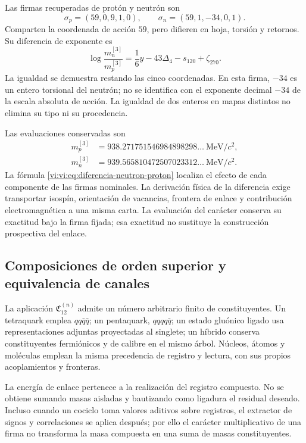 Las firmas recuperadas de protón y neutrón son
\[
 \sigma_p=(59,0,9,1,0),\qquad
 \sigma_n=(59,1,-34,0,1).
\]
Comparten la coordenada de acción \(59\), pero difieren en hoja,
torsión y retornos. Su diferencia de exponente es
\begin{equation}
 \log\frac{m_n^{[3]}}{m_p^{[3]}}
 =\frac16y-43\Delta_4-s_{120}+\zeta_{270}.
 \label{vi:vi:eq:diferencia-neutron-proton}
\end{equation}
La igualdad se demuestra restando las cinco coordenadas. En esta firma,
\(-34\) es un entero torsional del neutrón; no se identifica con el
exponente decimal \(-34\) de la escala absoluta de acción. La igualdad
de dos enteros en mapas distintos no elimina su tipo ni su procedencia.

Las evaluaciones conservadas son
\begin{align*}
 m_p^{[3]}&=938.271751546984898298\ldots\ \mathrm{MeV}/c^2,\\
 m_n^{[3]}&=939.565810472507023312\ldots\ \mathrm{MeV}/c^2.
\end{align*}
La fórmula \eqref{vi:vi:eq:diferencia-neutron-proton} localiza el efecto de
cada componente de las firmas nominales. La derivación física de la
diferencia exige transportar isospín, orientación de vacancias,
frontera de enlace y contribución electromagnética a una misma carta.
La evaluación del carácter conserva su exactitud bajo la firma fijada;
esa exactitud no sustituye la construcción prospectiva del enlace.

\subsection{Composiciones de orden superior y equivalencia de canales}
\label{vi:vi:subsec:compuestos-superiores}

La aplicación \(\mathfrak C_{12}^{(n)}\) admite un número arbitrario
finito de constituyentes. Un tetraquark emplea \(qq\bar q\bar q\);
un pentaquark, \(qqqq\bar q\); un estado gluónico ligado usa
representaciones adjuntas proyectadas al singlete; un híbrido conserva
constituyentes fermiónicos y de calibre en el mismo árbol. Núcleos,
átomos y moléculas emplean la misma precedencia de registro y lectura,
con sus propios acoplamientos y fronteras.

La energía de enlace pertenece a la realización del registro compuesto.
No se obtiene sumando masas aisladas y bautizando como ligadura el
residual deseado. Incluso cuando un cociclo toma valores aditivos sobre
registros, el extractor de signos y correlaciones se aplica después;
por ello el carácter multiplicativo de una firma no transforma la masa
compuesta en una suma de masas constituyentes.

